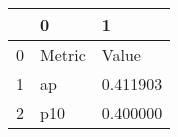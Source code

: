 \begin{tabular}{lll}
\toprule
 & 0 & 1 \\
\midrule
0 & Metric & Value \\
1 & ap & 0.411903 \\
2 & p10 & 0.400000 \\
\bottomrule
\end{tabular}
